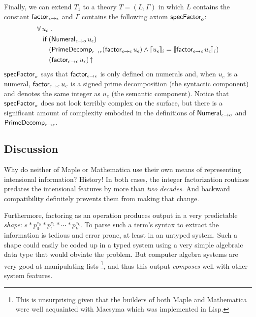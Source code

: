 \documentclass[fleqn]{llncs}
\begin{document}
Finally, we can extend $T_1$ to a theory $T = (L,\Gamma)$ in which $L$
contains the constant $\mbox{\sf factor}_{\epsilon \rightarrow \epsilon}$ and
$\Gamma$ contains the following axiom $\mbox{\sf specFactor}_o$:
\begin{align*}\setcounter{equation}{0}
&
\ForallApp u_\epsilon \mdot\\
& \hspace*{2ex}
\If \; (\mname{Numeral}_{\epsilon \tarrow o} \, u_\epsilon)\\
& \hspace*{4ex}
(\mname{PrimeDecomp}_{\epsilon \tarrow \epsilon}(\mname{factor}_{\epsilon \tarrow \epsilon} \, u_\epsilon) \And 
\sembrack{u_\epsilon}_i = \sembrack{\mname{factor}_{\epsilon \tarrow \epsilon} \, u_\epsilon}_i)
\\
& \hspace*{4ex}
(\mname{factor}_{\epsilon \tarrow \epsilon} \, u_\epsilon)\IsUndefApp
\end{align*}
$\mbox{\sf specFactor}_o$ says that $\mbox{\sf factor}_{\epsilon \rightarrow
  \epsilon}$ is only defined on numerals and, when $u_e$ is a numeral,
$\mbox{\sf factor}_{\epsilon \rightarrow \epsilon} \, u_e$ is a signed prime
decomposition (the syntactic component) and denotes the same integer
as $u_e$ (the semantic component).  Notice that $\mbox{\sf specFactor}_o$
does not look terribly complex on the surface, but there is a
significant amount of complexity embodied in the definitions of
$\mbox{\sf Numeral}_{\epsilon \rightarrow o}$ and
$\mbox{\sf PrimeDecomp}_{\epsilon \rightarrow \epsilon}$.

\subsection{Discussion}

Why do neither of Maple or Mathematica use their own means of
representing intensional information? History! In both cases, the
integer factorization routines predates the intensional features by
more than \emph{two decades}.  And backward compatibility definitely
prevents them from making that change.

Furthermore, factoring as an operation produces output in a very
predictable \emph{shape}: $s * p_0^{e_0} * p_1^{e_1} * \cdots *
p_k^{e_k}$.  To parse such a term's syntax to extract the information
is tedious and error prone, at least in an untyped system. Such a
shape could easily be coded up in a typed system using a very simple
algebraic data type that would obviate the problem. But computer
algebra systems are very good at manipulating lists%
\footnote{This is unsurprising given that the builders of both Maple
  and Mathematica were well acquainted with Macsyma which was
  implemented in Lisp.}, and thus this output \emph{composes} well
with other system features.
\end{document}
